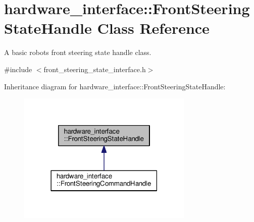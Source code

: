 \hypertarget{classhardware__interface_1_1FrontSteeringStateHandle}{}\section{hardware\+\_\+interface\+:\+:Front\+Steering\+State\+Handle Class Reference}
\label{classhardware__interface_1_1FrontSteeringStateHandle}


A basic robot\textquotesingle{}s front steering state handle class.  




{\ttfamily \#include $<$front\+\_\+steering\+\_\+state\+\_\+interface.\+h$>$}



Inheritance diagram for hardware\+\_\+interface\+:\+:Front\+Steering\+State\+Handle\+:\nopagebreak
\begin{figure}[H]
\begin{center}
\leavevmode
\includegraphics[width=237pt]{classhardware__interface_1_1FrontSteeringStateHandle__inherit__graph}
\end{center}
\end{figure}
